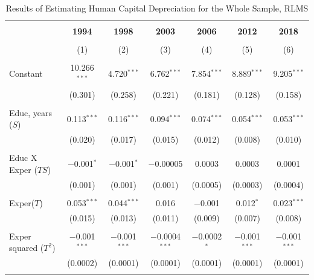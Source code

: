 \documentclass[alpha-refs]{wiley-article-02b}
\begin{document}




\setlength{\tabcolsep}{2pt}
\begin{table}[htbp!]
	\centering 
	\caption{Results of Estimating Human Capital Depreciation for the Whole Sample, RLMS} 
	\label{tab:2.1}
	\begin{tabular}{@{\extracolsep{3pt}}lcccccc} 
		\\[-1.8ex]\hline 
		\hline \\[-1.8ex] 
		& \textbf{1994} & \textbf{1998} & \textbf{2003} & \textbf{2006} & \textbf{2012} & \textbf{2018} \\ 
		\\[-1.8ex] & (1) & (2) & (3) & (4) & (5) & (6)\\ 
		\hline \\[-1.8ex] 
		Constant & 10.266$^{***}$ & 4.720$^{***}$ & 6.762$^{***}$ & 7.854$^{***}$ & 8.889$^{***}$ & 9.205$^{***}$ \\ 
		& (0.301) & (0.258) & (0.221) & (0.181) & (0.128) & (0.158) \\ 
		& & & & & & \\ 
		Educ, years ($S$) & 0.113$^{***}$ & 0.116$^{***}$ & 0.094$^{***}$ & 0.074$^{***}$ & 0.054$^{***}$ & 0.053$^{***}$ \\ 
		& (0.020) & (0.017) & (0.015) & (0.012) & (0.008) & (0.010) \\ 
		& & & & & & \\ 
		Educ X Exper ($TS$) & $-$0.001$^{*}$ & $-$0.001$^{*}$ & $-$0.00005 & 0.0003 & 0.0003 & 0.0001 \\ 
		& (0.001) & (0.001) & (0.001) & (0.0005) & (0.0003) & (0.0004) \\ 
		& & & & & & \\ 
		Exper($T$) & 0.053$^{***}$ & 0.044$^{***}$ & 0.016 & $-$0.001 & 0.012$^{*}$ & 0.023$^{***}$ \\ 
		& (0.015) & (0.013) & (0.011) & (0.009) & (0.007) & (0.008) \\ 
		& & & & & & \\ 
		Exper squared ($T^2$) & $-$0.001$^{***}$ & $-$0.001$^{***}$ & $-$0.0004$^{***}$ & $-$0.0002$^{*}$ & $-$0.001$^{***}$ & $-$0.001$^{***}$ \\ 
		& (0.0002) & (0.0001) & (0.0001) & (0.0001) & (0.0001) & (0.0001) \\ 
		& & & & & & \\ 

\end{tabular}
\end{table}
\end{document}
